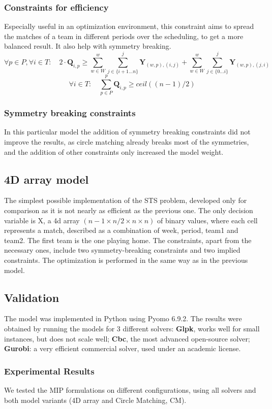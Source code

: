\subsubsection*{Constraints for efficiency}
Especially useful in an optimization environment, this constraint aims to spread the matches of a team in different periods over the scheduling, to get a more balanced result. It also help with symmetry breaking.
\[
    \forall p \in P, \forall i \in T: \quad 2 \cdot \textbf{Q}_{i,p} \geq 
    \sum_{w \in W}^{w}\sum_{j \in \{i+1\dots n\}}^{j} \textbf{Y}_{(w,p), (i,j)} + 
    \sum_{w \in W}^{w}\sum_{j \in \{0\dots i\}}^{j} \textbf{Y}_{(w,p), (j,i)}
\]
\[
    \forall i \in T: \quad \sum_{p \in P}^p \textbf{Q}_{i,p} \geq ceil((n-1)/2)
\]
\subsubsection*{Symmetry breaking constraints}
In this particular model the addition of symmetry breaking constraints did not improve the results, as circle matching already breaks most of the symmetries, and the addition of other constraints only increased the model weight.

\subsection{4D array model}
The simplest possible implementation of the STS problem, developed only for comparison as it is not nearly as efficient as the previous one.
The only decision variable is X, a 4d array $(n-1 \times n/2 \times n \times n)$ of binary values, where each cell represents a match, described as a combination of week, period, team1 and team2. The first team is the one playing home.
The constraints, apart from the necessary ones, include two symmetry-breaking constraints and two implied constraints.
The optimization is performed in the same way as in the previous model.

\subsection{Validation}
The model was implemented in Python using Pyomo 6.9.2. 
The results were obtained by running the models for 3 different solvers:
\textbf{Glpk}, works well for small instances, but does not scale well; \textbf{Cbc}, the most advanced open-source solver; \textbf{Gurobi}: a very efficient commercial solver, used under an academic license.

\subsubsection{Experimental Results}
We tested the MIP formulations on different configurations, using all solvers and both model variants (4D array and Circle Matching, CM). 


